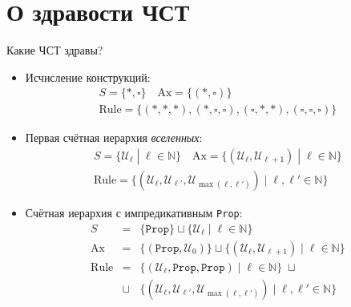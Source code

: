 \documentclass[russian]{beamer}
\begin{document}
\section{О здравости ЧСТ}
\begin{frame}{Какие ЧСТ здравы?}
\begin{itemize}
    \item Исчисление конструкций:
        \[\begin{array}{c}
            S=\{*,\square\}
            \quad \mathrm{Ax}=\{(*,\square)\}
            \\ \mathrm{Rule}=\{
                (*,*,*),(*,\square,\square),
                (\square,*,*),(\square,\square,\square)
            \}
        \end{array}\]
    \item Первая счётная иерархия \textit{вселенных}:
        \[\begin{array}{c}
            S=\{\mathcal{U}_\ell\;|\;\ell\in\mathbb{N}\}
            \quad \mathrm{Ax}=\{
                (\mathcal{U}_\ell,\mathcal{U}_{\ell+1})
                \;|\;\ell\in\mathbb{N}
            \}
            \\ \mathrm{Rule}=\{
                (\mathcal{U}_\ell, \mathcal{U}_{\ell'},
                \mathcal{U}_{\max(\ell,\ell')}) \;|\;
                \ell,\ell'\in\mathbb{N}
            \}
        \end{array}\]
    \item Счётная иерархия с импредикативным
        \texttt{Prop}:
        \[\begin{array}{rcl}
            S &=&\{\mathtt{Prop}\}\sqcup
            \{\mathcal{U}_\ell\;|\;\ell\in\mathbb{N}\}
            \\ \mathrm{Ax} &=&
            \{(\mathtt{Prop},\mathcal{U}_0)
            \}\sqcup\{
                (\mathcal{U}_\ell,\mathcal{U}_{\ell+1})
                \;|\;\ell\in\mathbb{N}
            \}
            \\ \mathrm{Rule} &=&\{
                (\mathcal{U}_\ell,\mathtt{Prop},
                \mathtt{Prop}) \;|\;
                \ell\in\mathbb{N}
            \} \;\sqcup
            \\ & \sqcup & \{
                (\mathcal{U}_\ell, \mathcal{U}_{\ell'},
                \mathcal{U}_{\max(\ell,\ell')}) \;|\;
                \ell,\ell'\in\mathbb{N}
            \}
        \end{array}\]
\end{itemize}
\end{frame}
\end{document}
